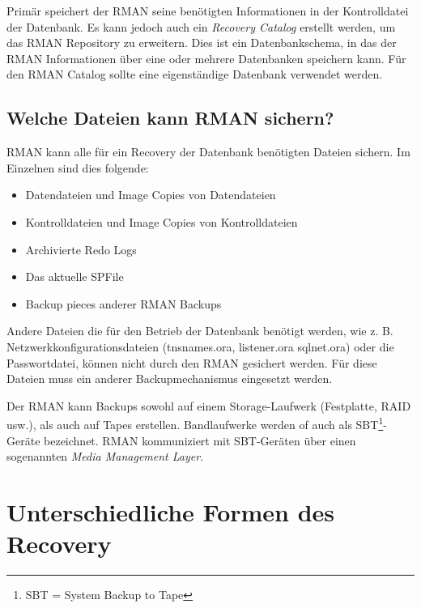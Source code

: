         Primär speichert der RMAN seine benötigten Informationen in der Kontrolldatei der Datenbank. Es kann jedoch auch ein \textit{Recovery Catalog} erstellt werden, um das RMAN Repository zu erweitern. Dies ist ein Datenbankschema, in das der RMAN Informationen über eine oder mehrere Datenbanken speichern kann. Für den RMAN Catalog sollte eine eigenständige Datenbank verwendet werden.
      \subsection{Welche Dateien kann RMAN sichern?}
        RMAN kann alle für ein Recovery der Datenbank benötigten Dateien sichern. Im Einzelnen sind dies folgende:
        \begin{itemize}
          \item Datendateien und Image Copies von Datendateien
          \item Kontrolldateien und Image Copies von Kontrolldateien
          \item Archivierte Redo Logs
          \item Das aktuelle SPFile
          \item Backup pieces anderer RMAN Backups
        \end{itemize}
        Andere Dateien die für den Betrieb der Datenbank benötigt werden, wie z. B. Netzwerkkonfigurationsdateien (tnsnames.ora, listener.ora sqlnet.ora) oder die Passwortdatei, können nicht durch den RMAN gesichert werden. Für diese Dateien muss ein anderer Backupmechanismus eingesetzt werden.

        Der RMAN kann Backups sowohl auf einem Storage-Laufwerk (Festplatte, RAID usw.), als auch auf Tapes erstellen. Bandlaufwerke werden of auch als SBT\footnote{SBT = System Backup to Tape}-Geräte bezeichnet. RMAN kommuniziert mit SBT-Geräten über einen sogenannten \textit{Media Management Layer}.
    \section{Unterschiedliche Formen des Recovery}
